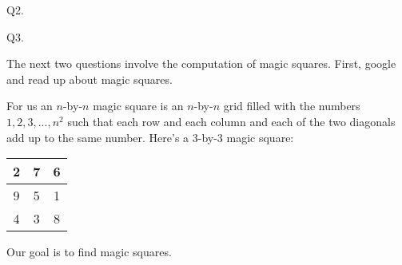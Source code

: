 \newpage
Q2.



\newpage
Q3. 


\newpage
The next two questions involve the computation of magic squares.
First, google and read up about magic squares.

For us an $n$-by-$n$ magic square  is an $n$-by-$n$ grid filled with the 
numbers $1, 2, 3, ..., n^2$ such that each row and each column
and each of the two diagonals add up to the same number.
Here's a 3-by-3 magic square:
\begin{longtable}{|c|c|c|}
\hline
2 & 7 & 6 \\ \hline
9 & 5 & 1 \\ \hline
4 & 3 & 8 \\ \hline
\end{longtable}

Our goal is to find magic squares. 

